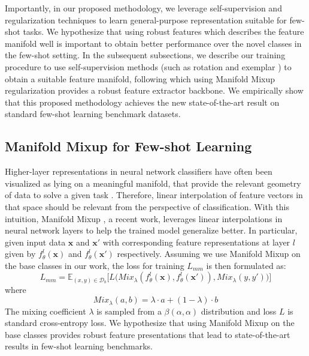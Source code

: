 \documentclass[10pt,twocolumn,letterpaper]{article}
\begin{document}
Importantly, in our proposed methodology, we leverage self-supervision and regularization techniques \cite{verma2019manifold,Spyros2018rotate,exemplar2014} to learn general-purpose representation suitable for few-shot tasks. We hypothesize that using robust features which describes the feature manifold well is important to obtain better performance over the novel classes in the few-shot setting. In the subsequent subsections, we describe our training procedure to use self-supervision methods (such as rotation \cite{Spyros2018rotate} and exemplar \cite{exemplar2014}) to obtain a suitable feature manifold, following which using Manifold Mixup regularization \cite{verma2019manifold} provides a robust feature extractor backbone. We empirically show that this proposed methodology achieves the new state-of-the-art result on standard few-shot learning benchmark datasets.






\subsection{Manifold Mixup for Few-shot Learning}
Higher-layer representations in neural network classifiers have often been visualized as lying on a meaningful manifold, that provide the relevant geometry of data to solve a given task \cite{bengio2013representation}. Therefore, linear interpolation of feature vectors in that space should be relevant from the perspective of classification. With this intuition, Manifold Mixup \cite{verma2019manifold}, a recent work, leverages linear interpolations in neural network layers to help the trained model generalize better.
In particular, given input data $\textbf{x}$ and $\textbf{x}'$ with corresponding feature representations at layer $l$ given by $f_{\theta}^l(\textbf{x})$ and $f_{\theta}^l(\textbf{x}')$ respectively. Assuming we use Manifold Mixup on the base classes in our work, the loss for training $L_{mm}$ is then formulated as:
\begin{equation}
    L_{mm} = \mathbb{E}_{(x,y) \in \mathcal{D}_b} \Big[ L \big( Mix_{\lambda}(f_{\theta}^l(\textbf{x}), f_{\theta}^l(\textbf{x}')), Mix_{\lambda}(y, y')\big) \Big]
\label{eq:manifold-mixup}
\end{equation}
where 
\begin{equation}
    Mix_{\lambda}(a,b) = \lambda \cdot a + (1-\lambda) \cdot b 
\label{eq:eqn_mixup}
\end{equation}
The mixing coefficient $\lambda$ is sampled from a $\beta (\alpha , \alpha)$ distribution and loss $L$ is standard cross-entropy loss. We hypothesize that using Manifold Mixup on the base classes provides robust feature presentations that lead to state-of-the-art results in few-shot learning benchmarks.
\end{document}
